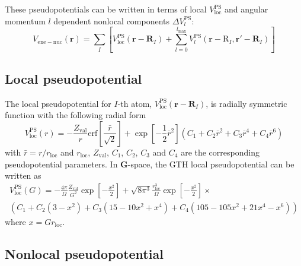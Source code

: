 \documentclass[a4paper,10pt]{article}
\begin{document}
These pseudopotentials can be written in terms of
local $V^{\mathrm{PS}}_{\mathrm{loc}}$ and
angular momentum $l$ dependent
nonlocal components $\Delta V^{\mathrm{PS}}_{l}$:
\begin{equation}
V_{\mathrm{ene-nuc}}(\mathbf{r}) =
\sum_{I} \left[
V^{\mathrm{PS}}_{\mathrm{loc}}(\mathbf{r}-\mathbf{R}_{I}) +
\sum_{l=0}^{l_{\mathrm{max}}}
V^{\mathrm{PS}}_{l}(\mathbf{r}-\mathrm{R}_{I},\mathbf{r}'-\mathbf{R}_{I})
\right]
\end{equation}

\subsection{Local pseudopotential}

The local pseudopotential for
$I$-th atom, $V^{\mathrm{PS}}_{\mathrm{loc}}(\mathbf{r}-\mathbf{R}_{I})$,
is radially symmetric
function with the following radial form
\begin{equation}
V^{\mathrm{PS}}_{\mathrm{loc}}(r) =
-\frac{Z_{\mathrm{val}}}{r}\mathrm{erf}\left[
\frac{\bar{r}}{\sqrt{2}} \right] +
\exp\left[-\frac{1}{2}\bar{r}^2\right]\left(
C_{1} + C_{2}\bar{r}^2 + C_{3}\bar{r}^4 + C_{4}\bar{r}^6
\right)
\label{eq:V_ps_loc_R}
\end{equation}
with $\bar{r}=r/r_{\mathrm{loc}}$ and $r_{\mathrm{loc}}$, $Z_{\mathrm{val}}$,
$C_{1}$, $C_{2}$, $C_{3}$ and $C_{4}$ are the corresponding pseudopotential
parameters.
In $\mathbf{G}$-space, the GTH local pseudopotential can be written as
\begin{multline}
V^{\mathrm{PS}}_{\mathrm{loc}}(G) = -\frac{4\pi}{\Omega}\frac{Z_{\mathrm{val}}}{G^2}
\exp\left[-\frac{x^2}{2}\right] +
\sqrt{8\pi^3} \frac{r^{3}_{\mathrm{loc}}}{\Omega}\exp\left[-\frac{x^2}{2}\right]\times\\
\left( C_{1} + C_{2}(3 - x^2) + C_{3}(15 - 10x^2 + x^4) + C_{4}(105 - 105x^2 + 21x^4 - x^6) \right)
\label{eq:V_ps_loc_G}
\end{multline}
where $x=G r_{\mathrm{loc}}$.

\subsection{Nonlocal pseudopotential}
\end{document}
